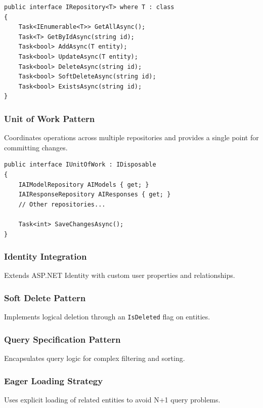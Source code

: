 \begin{verbatim}
public interface IRepository<T> where T : class
{
    Task<IEnumerable<T>> GetAllAsync();
    Task<T> GetByIdAsync(string id);
    Task<bool> AddAsync(T entity);
    Task<bool> UpdateAsync(T entity);
    Task<bool> DeleteAsync(string id);
    Task<bool> SoftDeleteAsync(string id);
    Task<bool> ExistsAsync(string id);
}
\end{verbatim}

\subsubsection*{Unit of Work Pattern}

Coordinates operations across multiple repositories and provides a single point for committing changes.

\begin{verbatim}
public interface IUnitOfWork : IDisposable
{
    IAIModelRepository AIModels { get; }
    IAIResponseRepository AIResponses { get; }
    // Other repositories...
    
    Task<int> SaveChangesAsync();
}
\end{verbatim}

\subsubsection*{Identity Integration}

Extends ASP.NET Identity with custom user properties and relationships.

\subsubsection*{Soft Delete Pattern}

Implements logical deletion through an \texttt{IsDeleted} flag on entities.

\subsubsection*{Query Specification Pattern}

Encapsulates query logic for complex filtering and sorting.

\subsubsection*{Eager Loading Strategy}

Uses explicit loading of related entities to avoid N+1 query problems.

